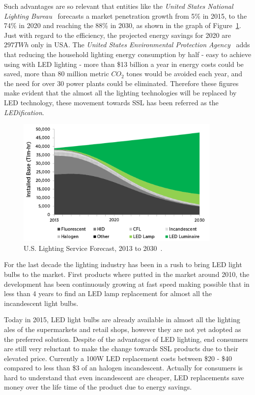 Such advantages are so relevant that entities like the \emph{United States National Lighting Bureau}~\cite{14USDoE} forecasts a market penetration growth from 5\% in 2015, to the 74\% in 2020 and reaching the 88\% in 2030, as shown in the graph of Figure~\ref{fig:lighting_forecast}. Just with regard to the efficiency, the projected energy savings for 2020 are $297TWh$ only in USA. The \emph{United States Environmental Protection Agency}~\cite{14USDoE} adds that reducing the household lighting energy consumption by half - easy to achieve using with LED lighting -  more than \$13 billion a year in energy costs could be saved, more than 80 million metric $CO_2$ tones would be avoided each year, and the need for over 30 power plants could be eliminated. Therefore these figures make evident that the almost all the lighting technologies will be replaced by LED technology, these movement towards SSL  has been referred as the \emph{LEDification}.

\begin{figure}[!h]
\centering
\includegraphics[width=10cm]{./0_intro/img/lighting_forecast.png}
\caption{U.S. Lighting Service Forecast, 2013 to 2030~\cite{14USDoE}.  }
\label{fig:lighting_forecast}
\end{figure}

For the last decade the lighting industry has been in a rush to bring LED light bulbs to the market. First products where putted in the market around 2010, the development has been continuously growing at fast speed making possible that in less than 4 years to find an LED lamp replacement for almost all the incandescent light bulbs.

Today in 2015, LED light bulbs are already available in almost all the lighting ales of the supermarkets and retail shops, however they are not yet adopted as the preferred solution. Despite of the advantages of LED lighting, end consumers are still very reluctant to make the change towards SSL products due to their elevated price. Currently a 100W LED replacement costs between \$20 - \$40 compared to less than \$3 of an halogen incandescent. Actually for consumers is hard to understand that even incandescent are cheaper, LED replacements save money over the life time of the product due to energy savings.

